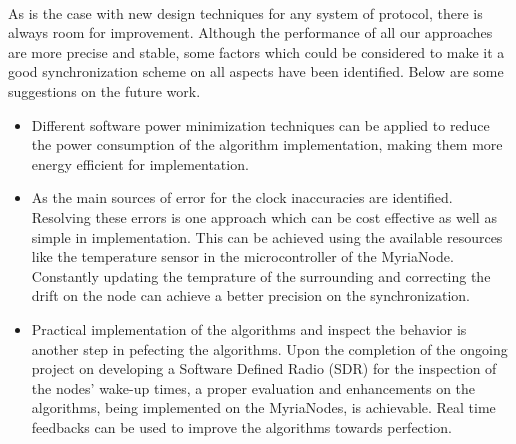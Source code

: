 \documentclass[a4paper,10pt]{report}
\begin{document}
\paragraph*{}
As is the case with new design techniques for any system of protocol, there is always room for improvement. Although the performance of all our approaches are more precise and stable,  some factors which could be considered to make it a good synchronization scheme on all
aspects have been identified. Below are some suggestions on the future work.
\begin{itemize}
\item
Different software power minimization techniques can be applied to reduce the power consumption of the algorithm implementation, making them more energy efficient for implementation.
\item  As the main sources of error for the clock inaccuracies are identified. Resolving these errors is one approach which can be cost effective as well as simple in implementation. This can be achieved using the available resources like the temperature sensor in the
microcontroller of the MyriaNode. Constantly updating the temprature of the surrounding and correcting the drift on the node can achieve a better precision on the synchronization.
\item
Practical implementation of the algorithms and inspect the behavior is another step in pefecting the algorithms. Upon the completion of the ongoing project on developing a Software Defined Radio (SDR) for the inspection of the nodes' wake-up times, a proper evaluation and enhancements on the algorithms, being implemented on the MyriaNodes, is achievable. Real time feedbacks can be used to improve the algorithms towards perfection.
\end{itemize}
\appendix
\end{document}
